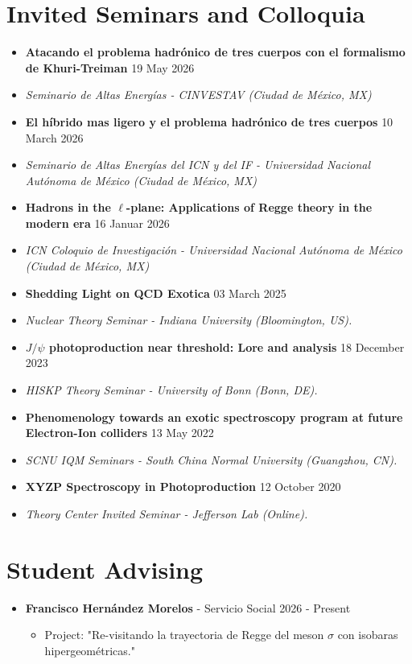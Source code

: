 \documentclass[letterpaper,11pt]{article}
\newcommand{\outerlist}[1]{
    \begin{itemize}[leftmargin=*] #1 \end{itemize}}
\newcommand{\denseouterlist}[1]{
    \begin{itemize}[leftmargin=*,itemsep=0pt] #1 \end{itemize}}
\newcommand{\innerlist}[1]{
    \begin{itemize}[topsep=0pt] #1 \end{itemize}}
\newcommand{\entry}[1]{\item\small{#1}}
\newcommand{\entrymid}[4][]{
    \item[#1] \small{#2} \hfill \small{#3}
    \vspace{-\smallskipamount} \item[]\small{\textit{#4}}}
\begin{document}

\section{Invited Seminars and Colloquia}
\denseouterlist
{
    \entrymid[\textbullet]
    {\textbf{Atacando el problema hadrónico de tres cuerpos con el formalismo de Khuri-Treiman}}{19 May 2026}{Seminario de Altas Energías - CINVESTAV (Ciudad de México, MX)   
    }

    \entrymid[\textbullet]
    {\textbf{El híbrido mas ligero y el problema hadrónico de tres cuerpos }}{10 March 2026}{Seminario de Altas Energías del ICN y del IF - Universidad Nacional Autónoma de México (Ciudad de México, MX)   
    }

    \entrymid[\textbullet]
    {\textbf{Hadrons in the $\ell$-plane: Applications of Regge theory in the modern era}}{16 Januar 2026}{ICN Coloquio de Investigación - Universidad Nacional Autónoma de México (Ciudad de México, MX)   
    }

    \entrymid[\textbullet]
    {\textbf{Shedding Light on QCD Exotica}}{03 March 2025}{Nuclear Theory Seminar - Indiana University (Bloomington, US). 
    }


    \entrymid[\textbullet]
    {\textbf{$J/\psi$ photoproduction near threshold: Lore and analysis}}{18 December 2023}{HISKP Theory Seminar - University of Bonn (Bonn, DE). 
    }

    \entrymid[\textbullet]
    {\textbf{Phenomenology towards an exotic spectroscopy program at future Electron-Ion colliders
    }}{13 May 2022}{SCNU IQM Seminars - South China Normal University (Guangzhou, CN).
    }

    \entrymid[\textbullet]
    {\textbf{XYZP Spectroscopy in Photoproduction}}{12 October 2020}{Theory Center Invited Seminar - Jefferson Lab (Online).
    }
}


\section{Student Advising}
\outerlist{
    \entry{\textbf{Francisco Hernández Morelos} - Servicio Social \hfill 2026 - Present}
        \innerlist{
            \entry{Project: "Re-visitando la trayectoria de Regge del meson $\sigma$ con isobaras hipergeométricas."}
        }
}
\end{document}
